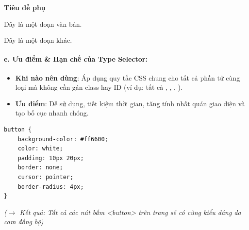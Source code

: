 \begin{browserWindow}
\sffamily\small
{} \par\vspace{2pt}
\flushleft
\textcolor{darkText}{\Large\bfseries Tiêu đề phụ} \par\vspace{2pt}
\textcolor{primaryBlue}{Đây là một đoạn văn bản.} \par\vspace{2pt}
\textcolor{primaryBlue}{Đây là một đoạn khác.}
\end{browserWindow}

\paragraph{e. Ưu điểm \& Hạn chế của Type Selector:}

\begin{tipBox}
\begin{itemize}[leftmargin=1.5em, itemsep=3pt, parsep=0pt]
    \item \textbf{Khi nào nên dùng}: Áp dụng quy tắc CSS chung cho tất cả phần tử cùng loại mà không cần gán class hay ID (ví dụ: tất cả , , , ).
    \item \textbf{Ưu điểm}: Dễ sử dụng, tiết kiệm thời gian, tăng tính nhất quán giao diện và tạo bố cục nhanh chóng.
\end{itemize}
\end{tipBox}

\begin{codeWindow}
\begin{lstlisting}[language=CSS3]
button {
    background-color: #ff6600;
    color: white;
    padding: 10px 20px;
    border: none;
    cursor: pointer;
    border-radius: 4px;
}
\end{lstlisting}
\end{codeWindow}

\begin{browserWindow}
\sffamily\small\centering
{} \quad
{} \par\vspace{4pt}
\textcolor{gray!70}{\small\textit{($\rightarrow$ Kết quả: Tất cả các nút bấm <button> trên trang sẽ có cùng kiểu dáng da cam đồng bộ)}}
\end{browserWindow}

